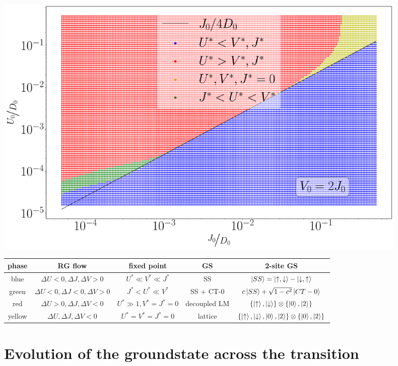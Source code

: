 \documentclass{report}
\numberwithin{equation}{section}
\begin{document}
\begin{center}
	\includegraphics[width=0.9\textwidth]{../figures/phase-map_D=1000.pdf}
\end{center}

\begin{center}
\begin{tabular}{|c|c|c|c|c|}
\hline
phase & RG flow & fixed point & GS & 2-site GS \\ 
\hline
blue & \(\Delta U <0, \Delta J,\Delta V>0\) & \(U^* \ll V^* \ll J^*\) & SS & \(\ket{SS}=\ket{\uparrow,\downarrow} - \ket{\downarrow, \uparrow}\)  \\ 
green &  \(\Delta U < 0, \Delta J < 0,\Delta V>0\) & \(J^* < U^* \ll V^*\) & SS + CT-0 & \(c\ket{SS} + \sqrt{1-c^2}\ket{CT-0}\)  \\  
red &  \(\Delta U > 0, \Delta J,\Delta V<0\) & \(U^* \gg 1,  V^* = J^* = 0\) & decoupled LM & \(\left\{\ket{\uparrow}, \ket{\downarrow} \right\} \otimes \left\{\ket{0}, \ket{2}\right\} \) \\
yellow &  \(\Delta U, \Delta J,\Delta V < 0\) & \(U^* = V^* = J^* = 0\) & lattice & \(\left\{\ket{\uparrow}, \ket{\downarrow}, \ket{0}, \ket{2} \right\} \otimes \left\{\ket{0}, \ket{2}\right\}\) \\
\hline
\end{tabular}
\end{center}

\section{Evolution of the groundstate across the transition}
\end{document}
